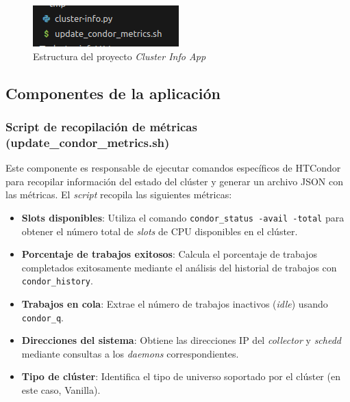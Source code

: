 \begin{figure}[H]
	\centering
	\includegraphics[scale=0.7]{tablas-images/pmv/estructura-proyecto-cluster-info-app.png}
	\caption{Estructura del proyecto \textit{Cluster Info App}}
	\label{fig:estructura-proyecto-cluster-info-app}
\end{figure}

\subsection{Componentes de la aplicación}
\noindent

\subsubsection{Script de recopilación de métricas (update\_condor\_metrics.sh)}
\noindent

Este componente es responsable de ejecutar comandos específicos de HTCondor para recopilar información del estado del clúster y generar un archivo JSON con las métricas. El \textit{script} recopila las siguientes métricas:

\begin{itemize}
	\item \textbf{Slots disponibles}: Utiliza el comando \texttt{condor\_status -avail -total} para obtener el número total de \textit{slots} de CPU disponibles en el clúster.
	
	\item \textbf{Porcentaje de trabajos exitosos}: Calcula el porcentaje de trabajos completados exitosamente mediante el análisis del historial de trabajos con \texttt{condor\_history}.
	
	\item \textbf{Trabajos en cola}: Extrae el número de trabajos inactivos (\textit{idle}) usando \texttt{condor\_q}.
	
	\item \textbf{Direcciones del sistema}: Obtiene las direcciones IP del \textit{collector} y \textit{schedd} mediante consultas a los \textit{daemons} correspondientes.
	
	\item \textbf{Tipo de clúster}: Identifica el tipo de universo soportado por el clúster (en este caso, Vanilla).
\end{itemize}

